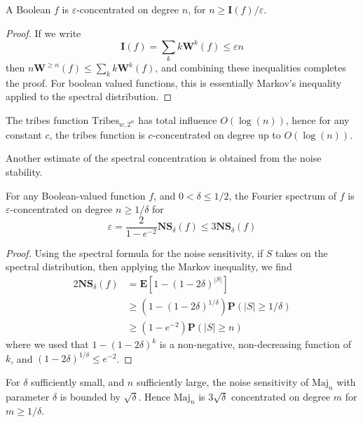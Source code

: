 \begin{theorem}
    A Boolean $f$ is $\varepsilon$-concentrated on degree $n$, for $n \geq \mathbf{I}(f)/\varepsilon$.
\end{theorem}
\begin{proof}
    If we write
    \[ \mathbf{I}(f) = \sum_k k \mathbf{W}^k(f) \leq \varepsilon n \]
    then $n \mathbf{W}^{\geq n}(f) \leq \sum_k k \mathbf{W}^k(f)$, and combining these inequalities completes the proof. For boolean valued functions, this is essentially Markov's inequality applied to the spectral distribution.
\end{proof}

\begin{example}
    The tribes function $\text{Tribes}_{w,2^w}$ has total influence $O(\log(n))$, hence for any constant $c$, the tribes function is $c$-concentrated on degree up to $O(\log(n))$.
\end{example}

Another estimate of the spectral concentration is obtained from the noise stability.

\begin{theorem}
    For any Boolean-valued function $f$, and $0 < \delta \leq 1/2$, the Fourier spectrum of $f$ is $\varepsilon$-concentrated on degree $n \geq 1/\delta$ for
    \[ \varepsilon = \frac{2}{1 - e^{-2}} \mathbf{NS}_\delta(f) \leq 3 \mathbf{NS}_\delta(f) \]
\end{theorem}
\begin{proof}
    Using the spectral formula for the noise sensitivity, if $S$ takes on the spectral distribution, then applying the Markov inequality, we find
    \begin{align*}
        2 \mathbf{NS}_\delta(f) &= \mathbf{E}[1 - (1 - 2\delta)^{|S|}]\\
        &\geq (1 - (1 - 2\delta)^{1/\delta}) \mathbf{P}(|S| \geq 1/\delta)\\
        &\geq (1 - e^{-2}) \mathbf{P}(|S| \geq n)
    \end{align*}
    where we used that $1 - (1 - 2\delta)^k$ is a non-negative, non-decreasing function of $k$, and $(1 - 2\delta)^{1/\delta} \leq e^{-2}$.
\end{proof}

\begin{example}
    For $\delta$ sufficiently small, and $n$ sufficiently large, the noise sensitivity of $\text{Maj}_n$ with parameter $\delta$ is bounded by $\sqrt{\delta}$. Hence $\text{Maj}_n$ is $3\sqrt{\delta}$ concentrated on degree $m$ for $m \geq 1/\delta$.
\end{example}

